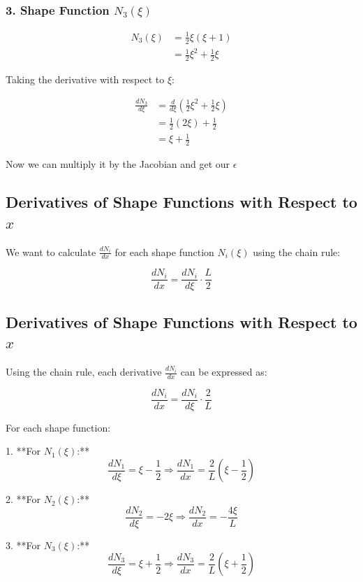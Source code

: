 \documentclass{article}
\begin{document}
\subsubsection*{3. Shape Function \( N_3(\xi) \)}

\begin{align*}
    N_3(\xi) &= \frac{1}{2} \xi (\xi + 1) \\
             &= \frac{1}{2} \xi^2 + \frac{1}{2} \xi
\end{align*}

Taking the derivative with respect to \( \xi \):

\begin{align*}
    \frac{dN_3}{d\xi} &= \frac{d}{d\xi} \left( \frac{1}{2} \xi^2 + \frac{1}{2} \xi \right) \\
                       &= \frac{1}{2} (2\xi) + \frac{1}{2} \\
                       &= \xi + \frac{1}{2}
\end{align*}

Now we can multiply it by the Jacobian and get our $\epsilon$

\subsection*{Derivatives of Shape Functions with Respect to \( x \)}

We want to calculate \( \frac{dN_i}{dx} \) for each shape function \( N_i(\xi) \) using the chain rule:

\[
\frac{dN_i}{dx} = \frac{dN_i}{d\xi} \cdot \frac{L}{2}
\]

\subsection*{Derivatives of Shape Functions with Respect to \( x \)}

Using the chain rule, each derivative \( \frac{dN_i}{dx} \) can be expressed as:

\[
\frac{dN_i}{dx} = \frac{dN_i}{d\xi} \cdot \frac{2}{L}
\]

For each shape function:

1. **For \( N_1(\xi) \):**
   \[
   \frac{dN_1}{d\xi} = \xi - \frac{1}{2} \Rightarrow \frac{dN_1}{dx} = \frac{2}{L} \left( \xi - \frac{1}{2} \right)
   \]

2. **For \( N_2(\xi) \):**
   \[
   \frac{dN_2}{d\xi} = -2\xi \Rightarrow \frac{dN_2}{dx} = -\frac{4\xi}{L}
   \]

3. **For \( N_3(\xi) \):**
   \[
   \frac{dN_3}{d\xi} = \xi + \frac{1}{2} \Rightarrow \frac{dN_3}{dx} = \frac{2}{L} \left( \xi + \frac{1}{2} \right)
   \]
\end{document}
